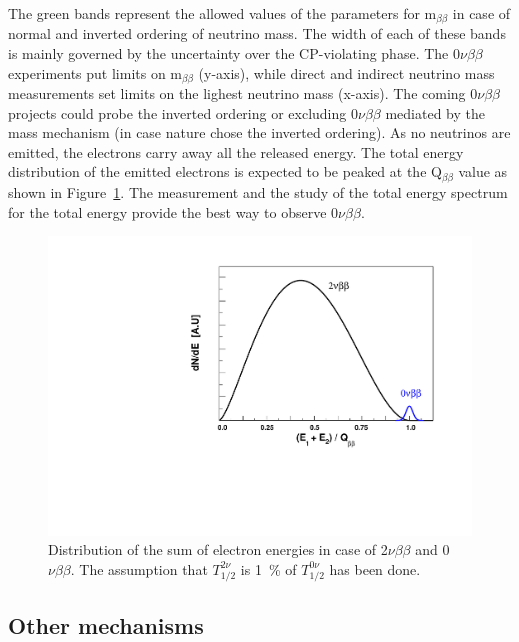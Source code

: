 \documentclass[main.tex]{subfiles}
\begin{document}
\NI The green bands represent the allowed values of the parameters for m$_{\beta\beta}$ in case of normal and inverted ordering of neutrino mass. The width of each of these bands is mainly governed by the uncertainty over the CP-violating phase. The 0$\nu\beta\beta$ experiments put limits on m$_{\beta\beta}$ (y-axis), while direct and indirect neutrino mass measurements set limits on the lighest neutrino mass (x-axis). The coming 0$\nu\beta\beta$ projects could probe the inverted ordering or excluding 0$\nu\beta\beta$ mediated by the mass mechanism (in case nature chose the inverted ordering). As no neutrinos are emitted, the electrons carry away all the released energy. The total energy distribution of the emitted electrons is expected to be peaked at the Q$_{\beta\beta}$ value as shown in Figure~\ref{EnergySpectrumDBD}. The measurement and the study of the total energy spectrum for the total energy provide the best way to observe 0$\nu\beta\beta$.


\begin{figure}[h!]
\begin{center}
\includegraphics[scale=0.45]{pictures/Chap2/BetaDecaySpectrum.pdf}
\caption{Distribution of the sum of electron energies in case of 2$\nu\beta\beta$ and 0$\nu\beta\beta$. The assumption that $T_{\text{1/2}}^{\text{2}\nu}$ is 1~\% of $T_{\text{1/2}}^{\text{0}\nu}$ has been done.}
\label{EnergySpectrumDBD}
\end{center}
\end{figure}


\FloatBarrier

\subsection{Other mechanisms}\label{sec:OtherMechanisms}
\end{document}
